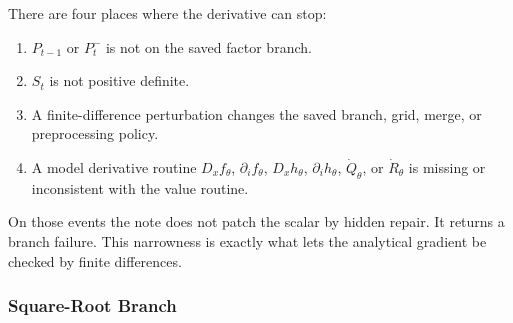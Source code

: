\documentclass[11pt]{article}
\numberwithin{equation}{section}
\begin{document}
There are four places where the derivative can stop:
\begin{enumerate}[leftmargin=0.24in]
\item \(P_{t-1}\) or \(P_t^-\) is not on the saved factor branch.
\item \(S_t\) is not positive definite.
\item A finite-difference perturbation changes the saved branch, grid, merge,
or preprocessing policy.
\item A model derivative routine \(D_xf_\theta\), \(\partial_i f_\theta\),
\(D_xh_\theta\), \(\partial_i h_\theta\), \(\dot Q_\theta\), or
\(\dot R_\theta\) is missing or inconsistent with the value routine.
\end{enumerate}
On those events the note does not patch the scalar by hidden repair.  It
returns a branch failure.  This narrowness is exactly what lets the analytical
gradient be checked by finite differences.

\subsubsection{Square-Root Branch}
\end{document}

